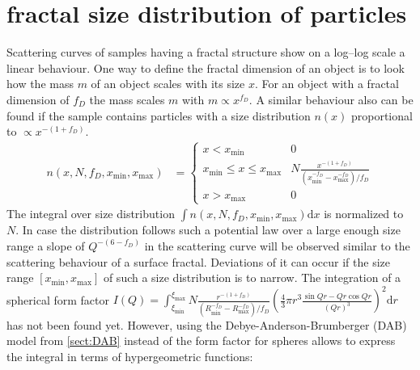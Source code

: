 \section{fractal size distribution of particles} \hspace{1pt}
\label{sec:ff_fractal_series}

Scattering curves of samples having a fractal structure show on a log–log scale a linear behaviour.
One way to define the fractal dimension of an object is to look how the mass $m$ of an object scales
with its size $x$. For an object with a fractal dimension of $f_D$ the mass scales $m$
with $m \propto x^{f_D}$. A similar behaviour also can be found if the sample contains
particles with a size distribution $n(x)$ proportional to $\propto x^{-(1+f_D)}$.
\begin{align}
n(x,N,f_D,x_\mathrm{min},x_\mathrm{max}) &=
\begin{cases}
x < x_\mathrm{min} & 0 \\
x_\mathrm{min}\leq x \leq x_\mathrm{max} & N \frac{x^{-(1+f_D)}}{\left(x_\mathrm{min}^{-f_D}-x_\mathrm{max}^{-f_D}\right)/f_D} \\
x > x_\mathrm{max}  & 0
\end{cases}
\end{align}
The integral over size distribution $\int n(x,N,f_D,x_\mathrm{min},x_\mathrm{max}) \mathrm{d}x$ is normalized to $N$.
In case the distribution follows such a potential law over a large enough size range a slope of
$Q^{-(6-f_D)}$ in the scattering curve will be observed similar to the scattering behaviour
of a surface fractal. Deviations of it can occur if the size range $[x_\mathrm{min},x_\mathrm{max}]$
of such a size distribution is to narrow. The integration of a spherical form factor
$
I(Q) = \int_{\xi_\mathrm{min}}^{\xi_\mathrm{max}} N\frac{r^{-(1+f_D)}}{\left(R_\mathrm{min}^{-f_D}-R_\mathrm{max}^{-f_D}\right)/f_D} \left(\frac{4}{3}\pi r^3 \frac{\sin Qr - Qr \cos Qr}{(Qr)^3}\right)^2 \mathrm{d}r
$
has not been found yet. However, using the Debye-Anderson-Brumberger (DAB) model from \ref{sect:DAB}
instead of the form factor for spheres allows to express the integral in terms of hypergeometric functions:

